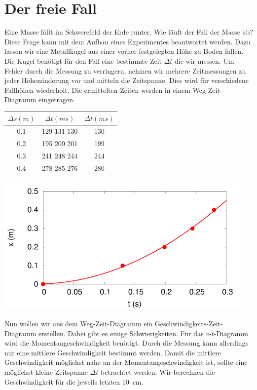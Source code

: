 \section*{Der freie Fall}

Eine Masse fällt im Schwerefeld der Erde runter. Wie läuft der Fall der Masse ab?
Diese Frage kann mit dem Aufbau eines Experimentes beantwortet werden.
Dazu lassen wir eine Metallkugel aus einer vorher festgelegten Höhe zu Boden fallen.
Die Kugel benötigt für den Fall eine bestimmte Zeit $\Delta t$ die wir messen.
Um Fehler durch die Messung zu verringern, nehmen wir mehrere Zeitmessungen zu jeder
Höhenänderung vor und mitteln die Zeitspanne.
Dies wird für verschiedene Fallhöhen wiederholt. 
Die ermittelten Zeiten werden in einem Weg-Zeit-Diagramm eingetragen.


\begin{minipage}{0.5\textwidth}
	\centering
	\begin{tabular}{ccc}
		$\Delta s (\si{m})$ & $\Delta t (\si{ms})$ & $\overline{\Delta t} (\si{ms})$ \\\hline
0.1 & 129 131 130 & 130\\
0.2 & 195 200 201 & 199\\
0.3 & 241 248 244 & 244\\
0.4 & 278 285 276 & 280\\
	\end{tabular}
\end{minipage}
\begin{minipage}{0.5\textwidth}
	\includegraphics[width=0.95\textwidth]{./freierfall_xt.pdf}
\end{minipage}

Nun wollen wir aus dem Weg-Zeit-Diagramm ein Geschwindigkeits-Zeit-Diagramm erstellen.
Dabei gibt es einige Schwierigkeiten. Für das $v$-$t$-Diagramm wird die Momentangeschwindigkeit
benötigt. Durch die Messung kann allerdings nur eine mittlere Geschwindigkeit bestimmt werden.
Damit die mittlere Geschwindigkeit möglichst nahe an der Momentangeschwindigkeit ist, sollte eine
möglichst kleine Zeitspanne $\Delta t$ betrachtet werden.
Wir berechnen die Geschwindigkeit für die jeweils letzten \SI{10}{cm}.



